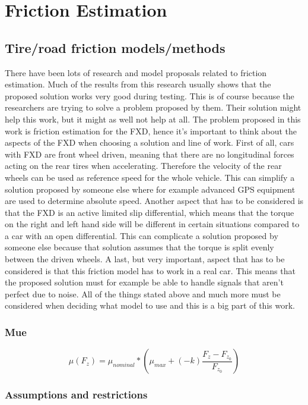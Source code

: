 \chapter{Friction Estimation}

\section{Tire/road friction models/methods}
There have been lots of research and model proposals related to friction estimation. Much of the results from this research usually shows that the proposed solution works very good during testing. This is of course because the researchers are trying to solve a problem proposed by them. Their solution might help this work, but it might as well not help at all. The problem proposed in this work is friction estimation for the FXD, hence it's important to think about the aspects of the FXD when choosing a solution and line of work. First of all, cars with FXD are front wheel driven, meaning that there are no longitudinal forces acting on the rear tires when accelerating. Therefore the velocity of the rear wheels can be used as reference speed for the whole vehicle. This can simplify a solution proposed by someone else where for example advanced GPS equipment are used to determine absolute speed. Another aspect that has to be considered is that the FXD is an active limited slip differential, which means that the torque on the right and left hand side will be different in certain situations compared to a car with an open differential. This can complicate a solution proposed by someone else because that solution assumes that the torque is split evenly between the driven wheels. A last, but very important, aspect that has to be considered is that this friction model has to work in a real car. This means that the proposed solution must for example be able to handle signals that aren't perfect due to noise. All of the things stated above and much more must be considered when deciding what model to use and this is a big part of this work.

\subsection{Mue}

\begin{equation}
\mu(F_{z})=\mu_{nominal}*(\mu_{max} + (-k)\frac{F_{z} - F_{z_{0}}}{F_{z_{0}}})
\end{equation}

\subsection{Assumptions and restrictions}



